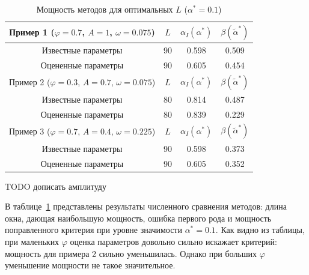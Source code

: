 \documentclass[specialist,
substylefile = spbu_report.rtx,
subf,href,colorlinks=true, 12pt]{disser}
\theoremstyle{definition}
\begin{document}
\begin{table}[h]
	\caption{Мощность методов для оптимальных $L$ ($\alpha^*=0.1$)}
	\label{tab:res_mc-ssa_est}
	\centering
	\begin{tabular}{|cccc|}\hline
		Пример 1 ($\varphi=0.7$, $A=1$, $\omega=0.075$) & $L$ & $\alpha_I(\alpha^*)$ & $\beta(\widetilde\alpha^*)$ \\
		\hline
		Известные параметры & 90 & 0.598 & 0.509 \\
		\hline
		Оцененные параметры & 90 & 0.605 & 0.454 \\
		\hhline{====}
		Пример 2 ($\varphi=0.3$, $A=0.7$, $\omega=0.075$) & $L$ & $\alpha_I(\alpha^*)$ & $\beta(\widetilde\alpha^*)$ \\
		\hline
		Известные параметры & 80 & 0.814 & 0.487 \\
		\hline
		Оцененные параметры & 80 & 0.839 & 0.229 \\
		\hhline{====}
		Пример 3 ($\varphi=0.7$, $A=0.4$, $\omega=0.225$) & $L$ & $\alpha_I(\alpha^*)$ & $\beta(\widetilde\alpha^*)$ \\
		\hline
		Известные параметры & 90 & 0.598 & 0.373 \\
		\hline
		Оцененные параметры & 90 & 0.605 & 0.352\\
		\hline
	\end{tabular}
\end{table}

TODO дописать амплитуду


В таблице~\ref{tab:res_mc-ssa_est} представлены результаты численного сравнения методов: длина окна, дающая наибольшую мощность, ошибка первого рода и мощность поправленного критерия при уровне значимости $\alpha^*=0.1$. Как видно из таблицы, при маленьких $\varphi$ оценка параметров довольно сильно искажает критерий: мощность для примера 2 сильно уменьшилась. Однако при больших $\varphi$ уменьшение мощности не такое значительное.


\end{document}
